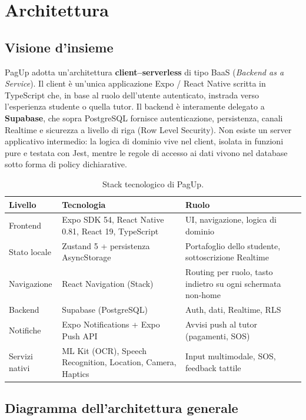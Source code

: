 \documentclass[11pt,a4paper]{article}
\begin{document}
\section{Architettura}

\subsection{Visione d'insieme}

PagUp adotta un'architettura \textbf{client--serverless} di tipo BaaS (\emph{Backend as a
Service}). Il client \`e un'unica applicazione Expo / React Native scritta in TypeScript che, in
base al ruolo dell'utente autenticato, instrada verso l'esperienza studente o quella tutor. Il
backend \`e interamente delegato a \textbf{Supabase}, che sopra PostgreSQL fornisce
autenticazione, persistenza, canali Realtime e sicurezza a livello di riga (Row Level Security).
Non esiste un server applicativo intermedio: la logica di dominio vive nel client, isolata in
funzioni pure e testata con Jest, mentre le regole di accesso ai dati vivono nel database sotto
forma di policy dichiarative.

\begin{table}[H]
\centering
\renewcommand{\arraystretch}{1.25}
\begin{tabularx}{\textwidth}{@{}p{3.6cm}p{4.4cm}X@{}}
\toprule
\textbf{Livello} & \textbf{Tecnologia} & \textbf{Ruolo} \\
\midrule
Frontend & Expo SDK 54, React Native 0.81, React 19, TypeScript & UI, navigazione, logica di dominio \\
Stato locale & Zustand 5 + persistenza AsyncStorage & Portafoglio dello studente, sottoscrizione Realtime \\
Navigazione & React Navigation (Stack) & Routing per ruolo, tasto indietro su ogni schermata non-home \\
Backend & Supabase (PostgreSQL) & Auth, dati, Realtime, RLS \\
Notifiche & Expo Notifications + Expo Push API & Avvisi push al tutor (pagamenti, SOS) \\
Servizi nativi & ML Kit (OCR), Speech Recognition, Location, Camera, Haptics & Input multimodale, SOS, feedback tattile \\
\bottomrule
\end{tabularx}
\caption{Stack tecnologico di PagUp.}
\end{table}

\subsection{Diagramma dell'architettura generale}
\end{document}
